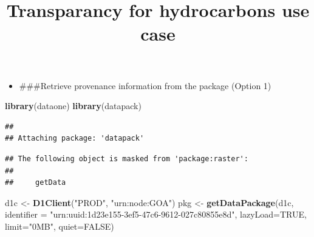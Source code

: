 \documentclass[]{article}
\title{Transparancy for hydrocarbons use case}
\author{}
\date{}
\newenvironment{Shaded}{\begin{snugshade}}{\end{snugshade}}
\newcommand{\DataTypeTok}[1]{\textcolor[rgb]{0.13,0.29,0.53}{#1}}
\newcommand{\KeywordTok}[1]{\textcolor[rgb]{0.13,0.29,0.53}{\textbf{#1}}}
\newcommand{\NormalTok}[1]{#1}
\newcommand{\OtherTok}[1]{\textcolor[rgb]{0.56,0.35,0.01}{#1}}
\newcommand{\StringTok}[1]{\textcolor[rgb]{0.31,0.60,0.02}{#1}}
\providecommand{\tightlist}{%
  \setlength{\itemsep}{0pt}\setlength{\parskip}{0pt}}
\begin{document}
\maketitle

\begin{itemize}
\tightlist
\item
  \#\#\#Retrieve provenance information from the package (Option 1)
\end{itemize}

\begin{Shaded}
\begin{Highlighting}[]
\KeywordTok{library}\NormalTok{(dataone)}
\KeywordTok{library}\NormalTok{(datapack)}
\end{Highlighting}
\end{Shaded}

\begin{verbatim}
## 
## Attaching package: 'datapack'
\end{verbatim}

\begin{verbatim}
## The following object is masked from 'package:raster':
## 
##     getData
\end{verbatim}

\begin{Shaded}
\begin{Highlighting}[]
\NormalTok{d1c <-}\StringTok{ }\KeywordTok{D1Client}\NormalTok{(}\StringTok{"PROD"}\NormalTok{, }\StringTok{"urn:node:GOA"}\NormalTok{)}
\NormalTok{pkg <-}\StringTok{ }\KeywordTok{getDataPackage}\NormalTok{(d1c, }\DataTypeTok{identifier =} \StringTok{"urn:uuid:1d23e155-3ef5-47c6-9612-027c80855e8d"}\NormalTok{, }\DataTypeTok{lazyLoad=}\OtherTok{TRUE}\NormalTok{, }\DataTypeTok{limit=}\StringTok{"0MB"}\NormalTok{, }\DataTypeTok{quiet=}\OtherTok{FALSE}\NormalTok{)}
\end{Highlighting}
\end{Shaded}
\end{document}

